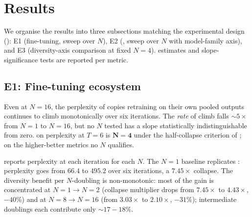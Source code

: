 \section{Results}
\label{sec:results}

We organise the results into three subsections matching the
experimental design (): E1 (fine-tuning, sweep
over $N$), E2 (\rag, sweep over $N$ with model-family axis), and E3
(diversity-axis comparison at fixed $N{=}4$). \mvp estimates and
slope-significance tests are reported per metric.

\subsection{E1: Fine-tuning ecosystem}
\label{sec:results_e1}

Even at $N{=}16$, the perplexity of \distilgpt copies retraining on
their own pooled outputs continues to climb monotonically over six
iterations. The \emph{rate} of climb falls $\sim 5\times$ from $N{=}1$
to $N{=}16$, but no $N$ tested has a slope statistically
indistinguishable from zero. \mvp on perplexity at $T{=}6$ is
$\mathbf{N{=}4}$ under the half-collapse criterion of
; on the higher-better metrics no $N$ qualifies.

 reports perplexity at each iteration for each $N$.
The $N{=}1$ baseline replicates \citet{shumailov2024nature}: perplexity
goes from $66.4$ to $495.2$ over six iterations, a $\mathbf{7.45\times}$
collapse. The diversity benefit per $N$-doubling is non-monotonic: most
of the gain is concentrated at $N{=}1{\to}N{=}2$ (collapse multiplier
drops from $7.45\times$ to $4.43\times$, $-40\%$) and at
$N{=}8{\to}N{=}16$ (from $3.03\times$ to $2.10\times$, $-31\%$);
intermediate doublings each contribute only $\sim 17{-}18\%$.

